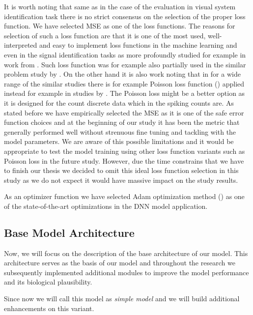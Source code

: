 It is worth noting that same as in the case of the evaluation in visual system identification task there is no strict consensus on the selection of the proper loss function. We have selected MSE as one of the loss functions. The reasons for selection of such a loss function are that it is one of the most used, well-interpreted and easy to implement loss functions in the machine learning and even in the signal identification tasks as more profoundly studied for example in work from \citet{wang2009mse, soderstrom2018errors}. Such loss function was for example also partially used in the similar problem study by \citet{antolik2016local}. On the other hand it is also work noting that in for a wide range of the similar studies there is for example Poisson loss function (\citet{terven2024lossfunctionsmetricsdeep}) applied instead for example in studies by \citet{Wang2023towards, sinz2018stimulus}. The Poisson loss might be a better option as it is designed for the count discrete data which in the spiking counts are. As stated before we have empirically selected the MSE as it is one of the safe error function choices and at the beginning of our study it has been the metric that generally performed well without strenuous fine tuning and tackling with the model parameters. We are aware of this possible limitations and it would be appropriate to test the model training using other loss function variants such as Poisson loss in the future study. However, due the time constrains that we have to finish our thesis we decided to omit this ideal loss function selection in this study as we do not expect it would have massive impact on the study results.

As an optimizer function we have selected Adam optimization method (\citet{kingma2017adammethodstochasticoptimization}) as one of the state-of-the-art optimizations in the DNN model application. 

\subsection{Base Model Architecture}
\label{subsec:base_model_architecture}
Now, we will focus on the description of the base architecture of our model. This architecture serves as the basis of our model and throughout the research we subsequently implemented additional modules to improve the model performance and its biological plausibility.

Since now we will call this model as \emph{simple model} and we will build additional enhancements on this variant.

